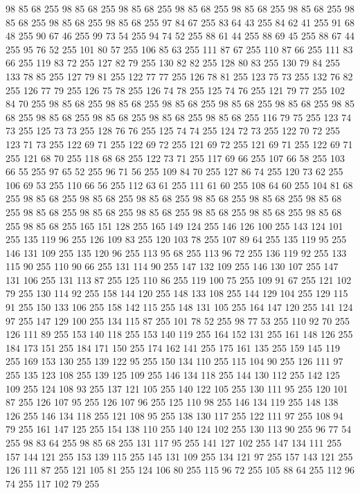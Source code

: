 98 85 68 255 98 85 68 255 98 85 68 255 98 85 68 255 98 85 68 255 98 85 68 255 98 85 68 255 98 85 68 255 98 85 68 255 97 84 67 255 83 64 43 255 84 62 41 255 91 68 48 255 90 67 46 255 99 73 54 255 94 74 52 255 88 61 44 255 88 69 45 255 88 67 44 255 95 76 52 255 101 80 57 255 106 85 63 255 111 87 67 255 110 87 66 255 111 83 66 255 119 83 72 255 127 82 79 255 130 82 82 255 128 80 83 255 130 79 84 255 133 78 85 255 127 79 81 255 122 77 77 255 126 78 81 255 123 75 73 255 132 76 82 255 126 77 79 255 126 75 78 255 126 74 78 255 125 74 76 255 121 79 77 255 102 84 70 255 98 85 68 255 98 85 68 255 98 85 68 255 98 85 68 255 98 85 68 255 98 85 68 255 98 85 68 255 98 85 68 255 98 85 68 255 98 85 68 255 116 79 75 255 123 74 73 255 125 73 73 255 128 76 76 255 125 74 74 255 124 72 73 255 122 70 72 255 123 71 73 255 122 69 71 255 122 69 72 255 121 69 72 255 121 69 71 255
122 69 71 255 121 68 70 255 118 68 68 255 122 73 71 255 117 69 66 255 107 66 58 255 103 66 55 255 97 65 52 255 96 71 56 255 109 84 70 255 127 86 74 255 120 73 62 255 106 69 53 255 110 66 56 255 112 63 61 255 111 61 60 255 108 64 60 255 104 81 68 255 98 85 68 255 98 85 68 255 98 85 68 255 98 85 68 255 98 85 68 255 98 85 68 255 98 85 68 255 98 85 68 255 98 85 68 255 98 85 68 255 98 85 68 255 98 85 68 255 98 85 68 255 165 151 128 255 165 149 124 255 146 126 100 255 143 124 101 255 135 119 96 255 126 109 83 255 120 103 78 255 107 89 64 255 135 119 95 255 146 131 109 255 135 120 96 255 113 95 68 255 113 96 72 255 136 119 92 255 133 115 90 255 110 90 66 255 131 114 90 255 147 132 109 255 146 130 107 255 147 131 106 255 131 113 87 255 125 110 86 255 119 100 75 255 109 91 67 255 121 102 79 255 130 114 92 255 158 144 120 255 148 133 108 255 144 129 104 255 129 115 91 255 150 133 106 255 158 142 115 255 148 131 105 255
164 147 120 255 141 124 97 255 147 129 100 255 134 115 87 255 101 78 52 255 98 77 53 255 110 92 70 255 126 111 89 255 153 140 118 255 153 140 119 255 164 152 131 255 161 148 126 255 184 173 151 255 184 171 150 255 174 162 141 255 175 161 135 255 159 145 119 255 169 153 130 255 139 122 95 255 150 134 110 255 115 104 90 255 126 111 97 255 135 123 108 255 139 125 109 255 146 134 118 255 144 130 112 255 142 125 109 255 124 108 93 255 137 121 105 255 140 122 105 255 130 111 95 255 120 101 87 255 126 107 95 255 126 107 96 255 125 110 98 255 146 134 119 255 148 138 126 255 146 134 118 255 121 108 95 255 138 130 117 255 122 111 97 255 108 94 79 255 161 147 125 255 154 138 110 255 140 124 102 255 130 113 90 255 96 77 54 255 98 83 64 255 98 85 68 255 131 117 95 255 141 127 102 255 147 134 111 255 157 144 121 255 153 139 115 255 145 131 109 255 134 121 97 255 157 143 121 255 126 111 87 255 121 105 81 255 124 106 80 255 115 96 72 255 105 88 64 255 112 96 74 255 117 102 79 255
